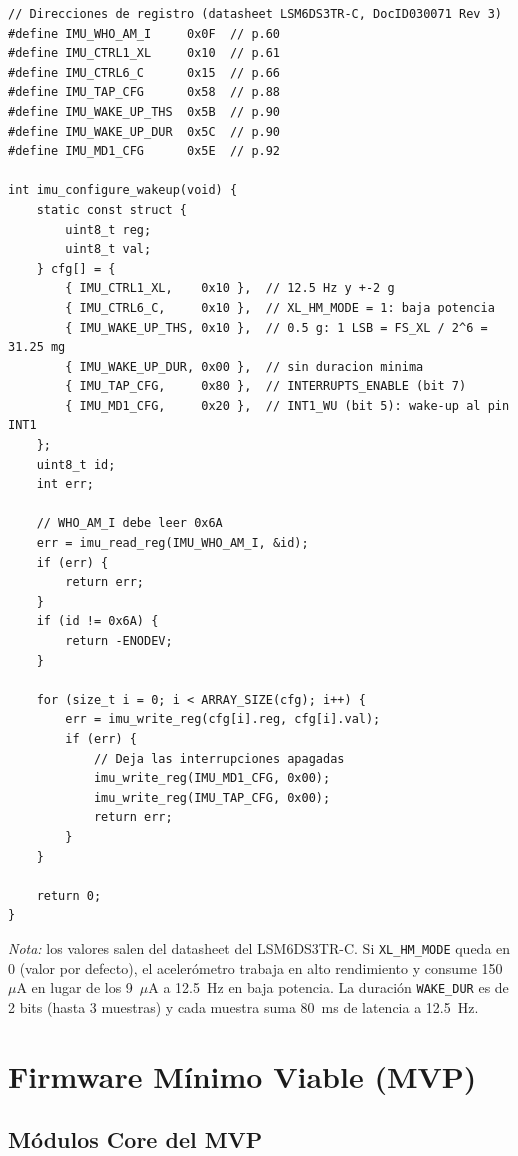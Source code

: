 \begin{verbatim}
// Direcciones de registro (datasheet LSM6DS3TR-C, DocID030071 Rev 3)
#define IMU_WHO_AM_I     0x0F  // p.60
#define IMU_CTRL1_XL     0x10  // p.61
#define IMU_CTRL6_C      0x15  // p.66
#define IMU_TAP_CFG      0x58  // p.88
#define IMU_WAKE_UP_THS  0x5B  // p.90
#define IMU_WAKE_UP_DUR  0x5C  // p.90
#define IMU_MD1_CFG      0x5E  // p.92

int imu_configure_wakeup(void) {
    static const struct {
        uint8_t reg;
        uint8_t val;
    } cfg[] = {
        { IMU_CTRL1_XL,    0x10 },  // 12.5 Hz y +-2 g
        { IMU_CTRL6_C,     0x10 },  // XL_HM_MODE = 1: baja potencia
        { IMU_WAKE_UP_THS, 0x10 },  // 0.5 g: 1 LSB = FS_XL / 2^6 = 31.25 mg
        { IMU_WAKE_UP_DUR, 0x00 },  // sin duracion minima
        { IMU_TAP_CFG,     0x80 },  // INTERRUPTS_ENABLE (bit 7)
        { IMU_MD1_CFG,     0x20 },  // INT1_WU (bit 5): wake-up al pin INT1
    };
    uint8_t id;
    int err;

    // WHO_AM_I debe leer 0x6A
    err = imu_read_reg(IMU_WHO_AM_I, &id);
    if (err) {
        return err;
    }
    if (id != 0x6A) {
        return -ENODEV;
    }

    for (size_t i = 0; i < ARRAY_SIZE(cfg); i++) {
        err = imu_write_reg(cfg[i].reg, cfg[i].val);
        if (err) {
            // Deja las interrupciones apagadas
            imu_write_reg(IMU_MD1_CFG, 0x00);
            imu_write_reg(IMU_TAP_CFG, 0x00);
            return err;
        }
    }

    return 0;
}
\end{verbatim}

\noindent\emph{Nota:} los valores salen del datasheet del LSM6DS3TR-C. Si \texttt{XL\_HM\_MODE} queda en 0 (valor por defecto), el acelerómetro trabaja en alto rendimiento y consume 150~$\mu$A en lugar de los 9~$\mu$A a 12.5~Hz en baja potencia. La duración \texttt{WAKE\_DUR} es de 2 bits (hasta 3 muestras) y cada muestra suma 80~ms de latencia a 12.5~Hz.

\section{Firmware Mínimo Viable (MVP)}

\subsection{Módulos Core del MVP}


